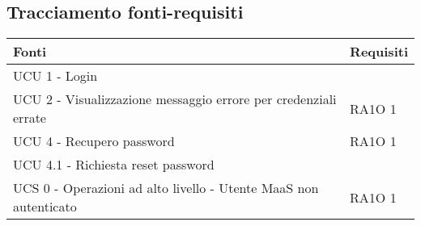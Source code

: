 \subsection{Tracciamento fonti-requisiti}
      \begin{center}
      \bgroup
      \def\arraystretch{1.8}
      \begin{longtable}{ | p{5cm} | p{5cm} |}
    
      \cellcolor[gray]{0.9} \textbf{Fonti} & \cellcolor[gray]{0.9} \textbf{Requisiti} \\ \hline       
            UCU 1 - Login &  \\ \hline      
            UCU 2 - Visualizzazione messaggio errore per credenziali errate &  RA1O 1 \newline  \\ \hline      
            UCU 4 - Recupero password &  RA1O 1 \newline  \\ \hline      
            UCU 4.1 - Richiesta reset password &  \\ \hline      
            UCS 0 - Operazioni ad alto livello - Utente MaaS non autenticato &  RA1O 1 \newline  \\ \hline     
      \end{longtable}
      \egroup
      \end{center}  
\clearpage

